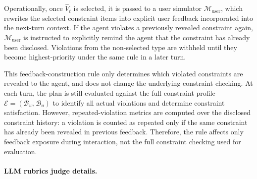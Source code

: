 Operationally, once \(\widehat{V}_t\) is selected, it is passed to a user simulator \(\mathcal{M}_{\mathrm{user}}\), which rewrites the selected constraint items into explicit user feedback incorporated into the next-turn context. 
If the agent violates a previously revealed constraint again, \(\mathcal{M}_{\mathrm{user}}\) is instructed to explicitly remind the agent that the constraint has already been disclosed. 
Violations from the non-selected type are withheld until they become highest-priority under the same rule in a later turn.

This feedback-construction rule only determines which violated constraints are revealed to the agent, and does not change the underlying constraint checking. At each turn, the plan is still evaluated against the full constraint profile $\mathcal{E}=(\mathcal{B}_w,\mathcal{B}_u)$ to identify all actual violations and determine constraint satisfaction. However, repeated-violation metrics are computed over the disclosed constraint history: a violation is counted as repeated only if the same constraint has already been revealed in previous feedback. Therefore, the rule affects only feedback exposure during interaction, not the full constraint checking used for evaluation.



\paragraph{LLM rubrics judge details.}


